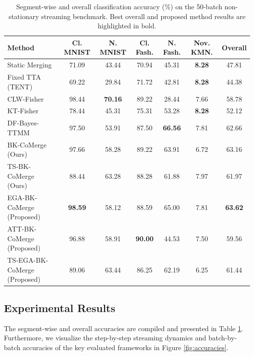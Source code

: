 \documentclass{article}
\theoremstyle{plain}
\theoremstyle{definition}
\theoremstyle{remark}
\begin{document}
\begin{table}[t]
\caption{Segment-wise and overall classification accuracy (\%) on the 50-batch non-stationary streaming benchmark. Best overall and proposed method results are highlighted in bold.}
\label{tab:results}
\vskip 0.15in
\begin{center}
\begin{small}
\begin{sc}
\setlength{\tabcolsep}{4pt}
\begin{tabular}{lcccccc}
\toprule
Method & Cl. MNIST & N. MNIST & Cl. Fash. & N. Fash. & Nov. KMN. & Overall \\
\midrule
Static Merging & 71.09 & 43.44 & 70.94 & 45.31 & \textbf{8.28} & 47.81 \\
Fixed TTA (TENT) & 69.22 & 29.84 & 71.72 & 42.81 & \textbf{8.28} & 44.38 \\
CLW-Fisher & 98.44 & \textbf{70.16} & 89.22 & 28.44 & 7.66 & 58.78 \\
KT-Fisher & 78.44 & 45.31 & 75.31 & 53.28 & \textbf{8.28} & 52.12 \\
DF-Bayes-TTMM & 97.50 & 53.91 & 87.50 & \textbf{66.56} & 7.81 & 62.66 \\
\midrule
BK-CoMerge (Ours) & 97.66 & 58.28 & 89.22 & 63.91 & 6.72 & 63.16 \\
TS-BK-CoMerge (Ours) & 88.44 & 63.28 & 88.28 & 61.88 & 7.97 & 61.97 \\
EGA-BK-CoMerge (Proposed) & \textbf{98.59} & 58.12 & 88.59 & 65.00 & 7.81 & \textbf{63.62} \\
ATT-BK-CoMerge (Proposed) & 96.88 & 58.91 & \textbf{90.00} & 44.53 & 7.50 & 59.56 \\
TS-EGA-BK-CoMerge (Proposed) & 89.06 & 63.44 & 86.25 & 62.19 & 6.25 & 61.44 \\
\bottomrule
\end{tabular}
\end{sc}
\end{small}
\end{center}
\vskip -0.1in
\end{table}

\subsection{Experimental Results}
The segment-wise and overall accuracies are compiled and presented in Table \ref{tab:results}. Furthermore, we visualize the step-by-step streaming dynamics and batch-by-batch accuracies of the key evaluated frameworks in Figure \ref{fig:accuracies}.
\end{document}
